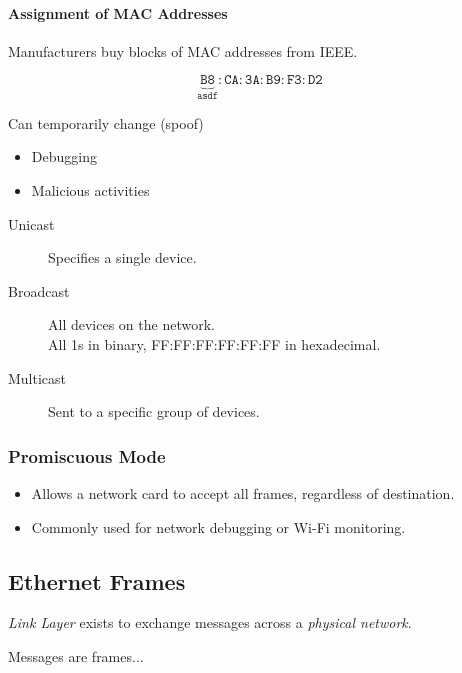 \documentclass{article}
\begin{document}
\paragraph*{Assignment of MAC Addresses}
Manufacturers buy blocks of MAC addresses from IEEE.

\begin{equation*}
    \mathtt{\underbrace{B8}_{\text{asdf}}:CA:3A:B9:F3:D2}
\end{equation*}

Can temporarily change (spoof)
\begin{itemize}
    \item Debugging
    \item Malicious activities
\end{itemize}

\begin{description}
    \item[Unicast] Specifies a single device.
    \item[Broadcast] All devices on the network. \\
          All 1s in binary, FF:FF:FF:FF:FF:FF in hexadecimal.
    \item[Multicast] Sent to a specific group of devices.
\end{description}

\subsubsection*{Promiscuous Mode}
\begin{itemize}
    \item Allows a network card to accept all frames, regardless of destination.
    \item Commonly used for network debugging or Wi-Fi monitoring.
\end{itemize}

\subsection*{Ethernet Frames}
\emph{Link Layer} exists to exchange messages across a \textit{physical
    network}.

Messages are frames...
\end{document}
